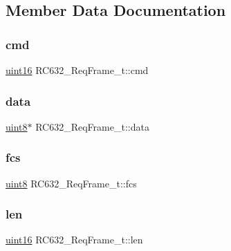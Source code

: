 \subsection{Member Data Documentation}
\mbox{\label{struct_r_c632___req_frame__t_a68d25a2924669c1db2505dfbd6fcb78c}} 
\subsubsection{\texorpdfstring{cmd}{cmd}}
{\footnotesize\ttfamily \mbox{\hyperlink{m1356dll_8h_a05f6b0ae8f6a6e135b0e290c25fe0e4e}{uint16}} R\+C632\+\_\+\+Req\+Frame\+\_\+t\+::cmd}

\mbox{\label{struct_r_c632___req_frame__t_a4a00ab754d5f558d2ad59f6550159638}} 
\subsubsection{\texorpdfstring{data}{data}}
{\footnotesize\ttfamily \mbox{\hyperlink{m1356dll_8h_adde6aaee8457bee49c2a92621fe22b79}{uint8}}$\ast$ R\+C632\+\_\+\+Req\+Frame\+\_\+t\+::data}

\mbox{\label{struct_r_c632___req_frame__t_a632b8737a5db3c9a947699c40345e165}} 
\subsubsection{\texorpdfstring{fcs}{fcs}}
{\footnotesize\ttfamily \mbox{\hyperlink{m1356dll_8h_adde6aaee8457bee49c2a92621fe22b79}{uint8}} R\+C632\+\_\+\+Req\+Frame\+\_\+t\+::fcs}

\mbox{\label{struct_r_c632___req_frame__t_a149ca47be10f9f2f248562e195e815de}} 
\subsubsection{\texorpdfstring{len}{len}}
{\footnotesize\ttfamily \mbox{\hyperlink{m1356dll_8h_a05f6b0ae8f6a6e135b0e290c25fe0e4e}{uint16}} R\+C632\+\_\+\+Req\+Frame\+\_\+t\+::len}

